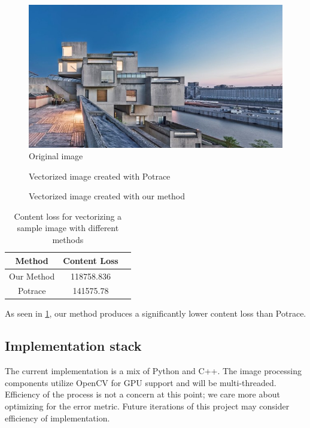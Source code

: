 \begin{figure}[H]
    \centering
    \includegraphics[width=\linewidth]{Figures/vectorization_images/original.jpg}
    \caption{Original image}
    \label{fig:house_original}
\end{figure}

\begin{figure}[H]
    \centering
    
    \caption{Vectorized image created with Potrace}
    \label{fig:house_potrace}
\end{figure}

\begin{figure}[H]
    \centering
    
    \caption{Vectorized image created with our method}
    \label{fig:house_our_method}
\end{figure}

\begin{table}[H]
    \centering
    \begin{tabular}{| c | c | c |}     \hline
        Method & Content Loss       \\ \hline
        Our Method & 118758.836     \\ \hline
        Potrace & 141575.78         \\ \hline
    \end{tabular}
    \caption{Content loss for vectorizing a sample image with different methods}
    \label{tab:house_content_loss}
\end{table}

As seen in \cref{tab:house_content_loss}, our method produces a significantly lower content loss than Potrace.

\subsection{Implementation stack}

The current implementation is a mix of Python and C++. The image processing components utilize OpenCV for GPU support and will be multi-threaded. Efficiency of the process is not a concern at this point; we care more about optimizing for the error metric. Future iterations of this project may consider efficiency of implementation.

